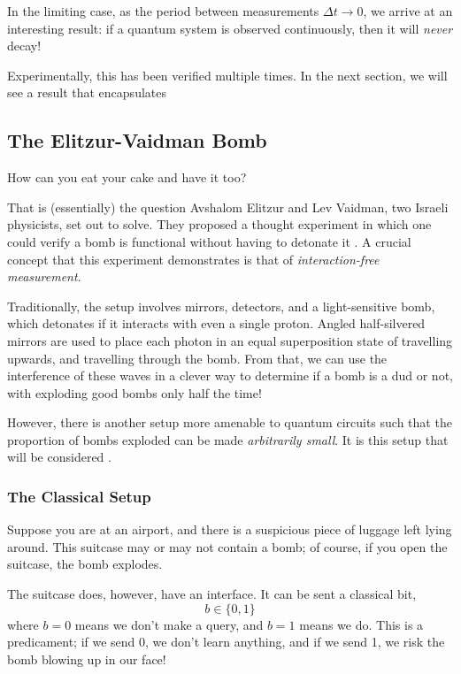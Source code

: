 \documentclass[12pt]{article}
\begin{document}
In the limiting case, as the period between measurements $\Delta t\to 0$, we arrive at an interesting result: if a quantum system is observed continuously, then it will \textit{never} decay!

Experimentally, this has been verified multiple times. In the next section, we will see a result that encapsulates 

\subsection{The Elitzur-Vaidman Bomb}

How can you eat your cake and have it too? 

That is (essentially) the question Avshalom Elitzur and Lev 
Vaidman, two Israeli physicists, set out to solve. They proposed a thought experiment in 
which one could verify a bomb is functional without having to detonate it \cite{Elitzur_1993}. A crucial concept that 
this experiment demonstrates is that of \textit{interaction-free measurement}.

Traditionally, the setup involves mirrors, detectors, and a light-sensitive bomb, which detonates if it interacts with even 
a single proton. Angled half-silvered mirrors are used to place each photon in an equal superposition 
state of travelling upwards, and travelling through the bomb. From that, we can use the interference of these waves in a 
clever way to determine if a bomb is a dud or not, with exploding good bombs only half the time! 

However, there is another setup more amenable to quantum circuits such that the proportion of bombs 
exploded can be made \textit{arbitrarily small}. It is this setup that will be considered \cite{scaaronson}.


\subsubsection{The Classical Setup}

Suppose you are at an airport, and there is a suspicious piece of luggage left lying around. This 
suitcase may or may not contain a bomb; of course, if you open the suitcase, the bomb explodes. 

The suitcase does, however, have an interface. It can be sent a classical bit, 
\[
b \in \{0,1\}    
\]
where $b=0$ means we don't make a query, and $b=1$ means we do. This is a predicament; if we send 0, we don't 
learn anything, and if we send 1, we risk the bomb blowing up in our face! 
\end{document}
